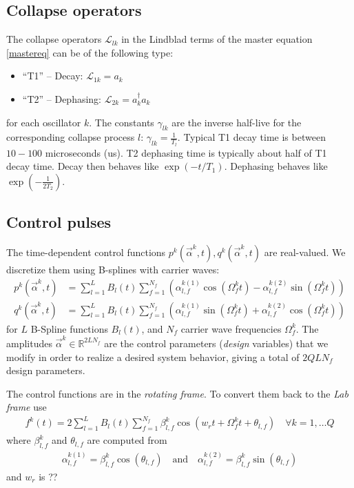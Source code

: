 \documentclass[letterpaper]{article}
\newcommand{\Ell}{\mathcal{L}}
\newcommand{\R}{\mathds{R}}
\begin{document}
\subsection{Collapse operators}
The collapse operators $\Ell_{lk}$ in the Lindblad terms of the master equation \eqref{mastereq} can be of the following type:
\begin{itemize}
  \item ``T1'' -- Decay: $\Ell_{1k} = a_k$
  \item ``T2'' -- Dephasing: $\Ell_{2k} = a_k^{\dagger}a_k$
\end{itemize}
for each oscillator $k$. The constants $\gamma_{lk}$ are the inverse half-live for the corresponding collapse process $l$: $\gamma_{lk} = {\frac{1}{T_l}}$. Typical T1 decay time is between $10-100$ microseconds (us). T2 dephasing time is typically about half of T1 decay time. Decay then behaves like $\exp(-t/{T_1})$. Dephasing behaves like $\exp(-\frac{1}{2{T_2}})$.

\subsection{Control pulses}
The time-dependent control functions $p^k(\vec{\alpha}^k,t), q^k(\vec{\alpha}^k,t)$ are real-valued. We discretize them using B-splines with carrier waves:
\begin{align}
  p^k(\vec{\alpha}^k,t) &= \sum_{l=1}^L B_l(t) \sum_{f=1}^{N_f} \left(\alpha^{k (1)}_{l,f} \cos(\Omega_f^k t) - \alpha^{k (2)}_{l,f} \sin(\Omega_f^k t) \right) \\
  q^k(\vec{\alpha}^k,t) &= \sum_{l=1}^L B_l(t) \sum_{f=1}^{N_f} \left( \alpha^{k (1)}_{l,f} \sin(\Omega_f^k t) + \alpha^{k (2)}_{l,f} \cos(\Omega_f^k t) \right)
\end{align}
for $L$ B-Spline functions $B_l(t)$, and $N_f$ carrier wave frequencies $\Omega_f^k$. The amplitudes $\vec{\alpha}^k \in \R^{2LN_f}$ are the control parameters (\textit{design} variables) that we modify in order to realize a desired system behavior, giving a total of $2QLN_f$ design parameters.

The control functions are in the \textit{rotating frame}. To convert them back to the \textit{Lab frame} use
\begin{align}
  f^k(t) = 2 \sum_{l=1}^L B_l(t) \sum_{f=1}^{N_f} \beta_{l,f}^k \cos(w_r t + \Omega_f^k t + \theta_{l,f}) \quad \forall k=1,\dots Q
\end{align}
where $\beta_{l,f}^k$ and $\theta_{l,f}$ are computed from
\begin{align}
  \alpha_{l,f}^{k(1)} = \beta_{l,f}^k \cos(\theta_{l,f}) \quad \text{and} \quad \alpha_{l,f}^{k(2)} = \beta_{l,f}^k \sin(\theta_{l,f})
\end{align}
and $w_r$ is ??
\end{document}
